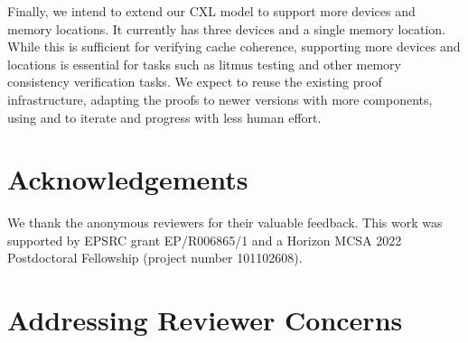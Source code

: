 \documentclass[10pt,conference]{IEEEtran}
\begin{document}
Finally, we intend to extend our CXL model to support more devices and memory locations. It currently has three devices %
and a single memory location. While this is sufficient for verifying cache coherence, supporting more devices and locations is essential for tasks such as litmus testing and other memory consistency verification tasks. We expect to reuse the existing proof infrastructure, adapting the proofs to newer versions with more components, using \supersketch{} and \superfix{} to iterate and progress with less human effort.



\section*{Acknowledgements}
We thank the anonymous reviewers for their valuable feedback.
This work was supported by EPSRC grant EP/R006865/1 and a Horizon MCSA 2022 Postdoctoral Fellowship (project number 101102608).



\iffalse
\appendices
\section{Addressing Reviewer Concerns}
\end{document}
